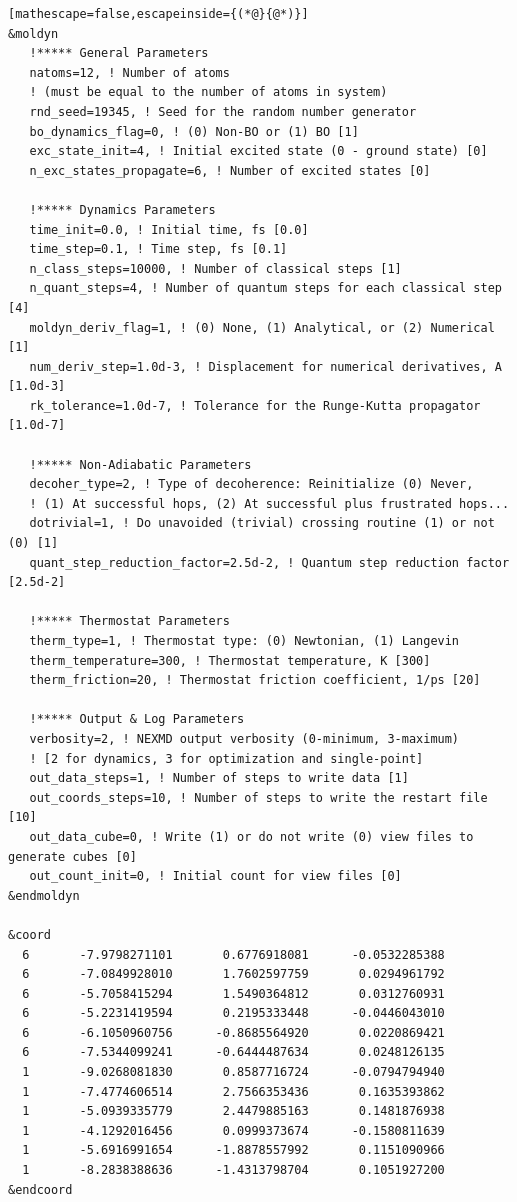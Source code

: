 \documentclass[letterpaper,12pt,titlepage]{article}
\begin{document}
\begin{appendix}
\begin{lstlisting}[mathescape=false,escapeinside={(*@}{@*)}]
&moldyn
   !***** General Parameters
   natoms=12, ! Number of atoms 
   ! (must be equal to the number of atoms in system)
   rnd_seed=19345, ! Seed for the random number generator
   bo_dynamics_flag=0, ! (0) Non-BO or (1) BO [1]
   exc_state_init=4, ! Initial excited state (0 - ground state) [0]
   n_exc_states_propagate=6, ! Number of excited states [0]

   !***** Dynamics Parameters
   time_init=0.0, ! Initial time, fs [0.0]
   time_step=0.1, ! Time step, fs [0.1]
   n_class_steps=10000, ! Number of classical steps [1]
   n_quant_steps=4, ! Number of quantum steps for each classical step [4]
   moldyn_deriv_flag=1, ! (0) None, (1) Analytical, or (2) Numerical [1]
   num_deriv_step=1.0d-3, ! Displacement for numerical derivatives, A [1.0d-3]
   rk_tolerance=1.0d-7, ! Tolerance for the Runge-Kutta propagator [1.0d-7]

   !***** Non-Adiabatic Parameters
   decoher_type=2, ! Type of decoherence: Reinitialize (0) Never, 
   ! (1) At successful hops, (2) At successful plus frustrated hops... 
   dotrivial=1, ! Do unavoided (trivial) crossing routine (1) or not (0) [1]
   quant_step_reduction_factor=2.5d-2, ! Quantum step reduction factor [2.5d-2]

   !***** Thermostat Parameters
   therm_type=1, ! Thermostat type: (0) Newtonian, (1) Langevin
   therm_temperature=300, ! Thermostat temperature, K [300]
   therm_friction=20, ! Thermostat friction coefficient, 1/ps [20]

   !***** Output & Log Parameters
   verbosity=2, ! NEXMD output verbosity (0-minimum, 3-maximum)
   ! [2 for dynamics, 3 for optimization and single-point]
   out_data_steps=1, ! Number of steps to write data [1]
   out_coords_steps=10, ! Number of steps to write the restart file [10]
   out_data_cube=0, ! Write (1) or do not write (0) view files to generate cubes [0]
   out_count_init=0, ! Initial count for view files [0]
&endmoldyn

&coord
  6       -7.9798271101       0.6776918081      -0.0532285388
  6       -7.0849928010       1.7602597759       0.0294961792
  6       -5.7058415294       1.5490364812       0.0312760931
  6       -5.2231419594       0.2195333448      -0.0446043010
  6       -6.1050960756      -0.8685564920       0.0220869421
  6       -7.5344099241      -0.6444487634       0.0248126135
  1       -9.0268081830       0.8587716724      -0.0794794940
  1       -7.4774606514       2.7566353436       0.1635393862
  1       -5.0939335779       2.4479885163       0.1481876938
  1       -4.1292016456       0.0999373674      -0.1580811639
  1       -5.6916991654      -1.8878557992       0.1151090966
  1       -8.2838388636      -1.4313798704       0.1051927200
&endcoord


\end{lstlisting}
\end{appendix}
\end{document}

